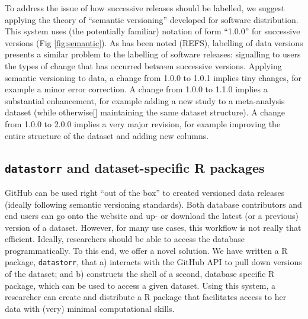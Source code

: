 \documentclass[a4paper,11pt]{article}
\newcommand{\smurl}[1]{{\footnotesize\url{#1}}}
\begin{document}
To address the issue of how successive releases should be labelled, we suggest
applying the theory of ``semantic versioning'' developed for software
distribution. This system uses (the potentially familiar) notation of form
``1.0.0'' for successive versions (Fig \ref{fig:semantic}). As has been noted
(REFS), labelling of data versions presents a similar problem to the labelling
of software releases: signalling to users the types of change that has
occurred between successive versions. Applying semantic versioning to data, a
change from 1.0.0 to 1.0.1 implies tiny changes, for example a minor error
correction. A change from 1.0.0 to 1.1.0 implies a substantial enhancement,
for example adding a new study to a meta-analysis dataset (while otherwise[]
maintaining the same dataset structure). A change from 1.0.0 to 2.0.0 implies
a very major revision, for example improving the entire structure of the
dataset and adding new columns.

\subsection{\texttt{datastorr} and dataset-specific R packages}

GitHub can be used right ``out of the box'' to created versioned data releases
(ideally following semantic versioning standards). Both database contributors and end users
can go onto the website and up- or download the latest (or a previous) version of a dataset.
However, for many use cases, this workflow is not really that efficient. Ideally, researchers
should be able to access the database programmatically. To this end, we offer a novel solution.
We have written a R package, \texttt{datastorr}, that a) interacts with the GitHub API to pull 
down versions of the dataset; and b) constructs the shell of a second, database specific R
package, which can be used to access a given dataset. Using this system, a researcher can create
and distribute a R package that facilitates access to her data with (very) minimal computational skills.


\end{document}
